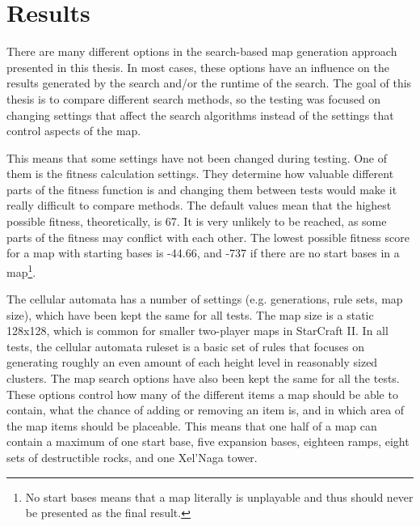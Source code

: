 \chapter{Results}
\label{results}
There are many different options in the search-based map generation approach presented in this thesis. In most cases, these options have an influence on the results generated by the search and/or the runtime of the search. The goal of this thesis is to compare different search methods, so the testing was focused on changing settings that affect the search algorithms instead of the settings that control aspects of the map.

This means that some settings have not been changed during testing. One of them is the fitness calculation settings. They determine how valuable different parts of the fitness function is and changing them between tests would make it really difficult to compare methods. The default values mean that the highest possible fitness, theoretically, is 67. It is very unlikely to be reached, as some parts of the fitness may conflict with each other. The lowest possible fitness score for a map with starting bases is -44.66, and -737 if there are no start bases in a map\footnote{No start bases means that a map literally is unplayable and thus should never be presented as the final result.}.

The cellular automata has a number of settings (e.g. generations, rule sets, map size), which have been kept the same for all tests. The map size is a static 128x128, which is common for smaller two-player maps in StarCraft II. In all tests, the cellular automata ruleset is a basic set of rules that focuses on generating roughly an even amount of each height level in reasonably sized clusters. The map search options have also been kept the same for all the tests. These options control how many of the different items a map should be able to contain, what the chance of adding or removing an item is, and in which area of the map items should be placeable. This means that one half of a map can contain a maximum of one start base, five expansion bases, eighteen ramps, eight sets of destructible rocks, and one Xel'Naga tower. 




